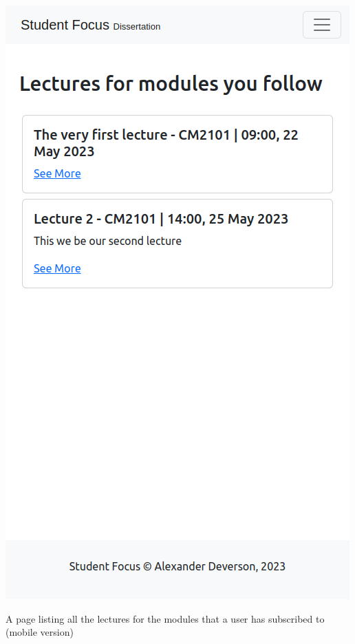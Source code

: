 \includegraphics[scale=0.20]{images/application/40 - mobile.png}

A page listing all the lectures for the modules that a user has subscribed to (mobile version)

